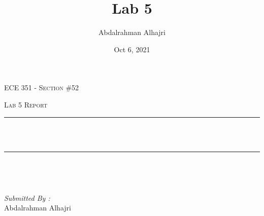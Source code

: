 \documentclass[12pt]{report}
\title{Lab 5}
\author{ Abdalrahman Alhajri}
\date{Oct 6, 2021}
\makeatletter
\let\thetitle\@title
\makeatother
\begin{document}

\begin{titlepage}
	\centering
    \vspace*{0.5 cm}
\begin{center}    \textsc{\Large   ECE 351 - Section \#52 }\\[2.0 cm]	\end{center}%
	\textsc{\Large Lab 5 Report }\\[0.5 cm]				%
	\rule{\linewidth}{0.2 mm} \\[0.4 cm]
	{ \huge \bfseries \thetitle}\\
	\rule{\linewidth}{0.2 mm} \\[1.5 cm]
	
	\begin{minipage}{0.4\textwidth}
		\begin{flushleft} \large
			\end{flushleft}
			\end{minipage}~
			\begin{minipage}{0.4\textwidth}
            
			\begin{flushright} \large
			\emph{Submitted By :} \\
			Abdalrahman Alhajri  
		\end{flushright}
           
	\end{minipage}\\[2 cm]
	
    
    
    
    
	
\end{titlepage}


\tableofcontents
\pagebreak

\renewcommand{\thesection}{\arabic{section}}
\end{document}
